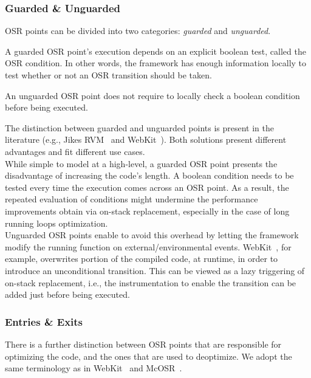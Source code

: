 \subsubsection{Guarded \& Unguarded}

OSR points can be divided into two categories: \textit{guarded} and \textit{unguarded}.
\begin{definition}
A guarded OSR point's execution depends on an explicit boolean test, called the OSR condition.
In other words, the framework has enough information locally to test whether or not an OSR transition should be taken.
\end{definition}
\begin{definition}
An unguarded OSR point does not require to locally check a boolean condition before being executed. 
\end{definition}
The distinction between guarded and unguarded points is present in the literature (e.g., Jikes RVM~\cite{fink2003design, soman2006efficient} and WebKit~\cite{WebKitURL}).
Both solutions present different advantages and fit different use cases.\\

While simple to model at a high-level, a guarded OSR point presents the disadvantage of increasing the code's length. 
A boolean condition needs to be tested every time the execution comes across an OSR point.
As a result, the repeated evaluation of conditions might undermine the performance improvements obtain via on-stack replacement, especially in the case of long running loops optimization.\\

Unguarded OSR points enable to avoid this overhead by letting the framework modify the running function on external/environmental events.
WebKit~\cite{WebKitURL}, for example, overwrites portion of the compiled code, at runtime, in order to introduce an unconditional transition.
This can be viewed as a lazy triggering of on-stack replacement, i.e., the instrumentation to enable the transition can be added just before being executed.\\

\subsubsection{Entries \& Exits}

There is a further distinction between OSR points that are responsible for optimizing the code, and the ones that are used to deoptimize.
We adopt the same terminology as in WebKit~\cite{WebKitURL} and McOSR~\cite{lameed2013modular}.

